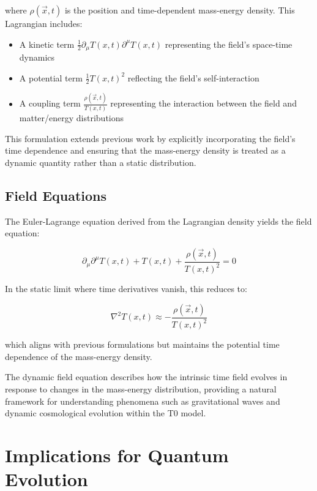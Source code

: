 \documentclass[12pt,a4paper]{article}
\newcommand{\Tfieldt}{T(x,t)}
\newcommand{\vecx}{\vec{x}}
\begin{document}
	where $\rho(\vecx,t)$ is the position and time-dependent mass-energy density. This Lagrangian includes:
	
	\begin{itemize}
		\item A kinetic term $\frac{1}{2}\partial_{\mu}\Tfieldt\partial^{\mu}\Tfieldt$ representing the field's space-time dynamics
		\item A potential term $\frac{1}{2}\Tfieldt^2$ reflecting the field's self-interaction
		\item A coupling term $\frac{\rho(\vecx,t)}{\Tfieldt}$ representing the interaction between the field and matter/energy distributions
	\end{itemize}
	
	This formulation extends previous work \cite{pascher_lagrange_2025} by explicitly incorporating the field's time dependence and ensuring that the mass-energy density is treated as a dynamic quantity rather than a static distribution.
	
	\subsection{Field Equations}
	\label{subsec:field_equations}
	
	The Euler-Lagrange equation derived from the Lagrangian density yields the field equation:
	
	\begin{equation}
		\partial_{\mu}\partial^{\mu}\Tfieldt + \Tfieldt + \frac{\rho(\vecx,t)}{\Tfieldt^2} = 0
		\label{eq:field_equation}
	\end{equation}
	
	In the static limit where time derivatives vanish, this reduces to:
	
	\begin{equation}
		\nabla^2 \Tfieldt \approx -\frac{\rho(\vecx,t)}{\Tfieldt^2}
		\label{eq:static_approximation}
	\end{equation}
	
	which aligns with previous formulations \cite{pascher_emergente_2025} but maintains the potential time dependence of the mass-energy density.
	
	The dynamic field equation describes how the intrinsic time field evolves in response to changes in the mass-energy distribution, providing a natural framework for understanding phenomena such as gravitational waves and dynamic cosmological evolution within the T0 model.
	
	\section{Implications for Quantum Evolution}
	\label{sec:quantum_evolution}
	
\end{document}
